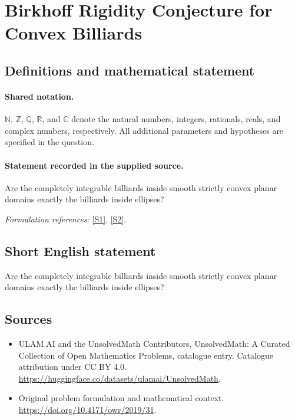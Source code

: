 \documentclass[11pt]{article}
\newcommand{\sref}[2]{\hyperlink{source:#1:#2}{[S#2]}}
\begin{document}
\section{Birkhoff Rigidity Conjecture for Convex Billiards}\label{statement}

\subsection{Definitions and mathematical statement}

\paragraph{Shared notation.}$\mathbb N$, $\mathbb Z$, $\mathbb Q$, $\mathbb R$, and $\mathbb C$ denote the natural numbers, integers, rationals, reals, and complex numbers, respectively. All additional parameters and hypotheses are specified in the question.


\paragraph{Statement recorded in the supplied source.}
Are the completely integrable billiards inside smooth strictly convex planar domains exactly the billiards inside ellipses?
\par\smallskip\textit{Formulation references:} \sref{statement}{1}, \sref{statement}{2}.
\subsection{Short English statement}
Are the completely integrable billiards inside smooth strictly convex planar domains exactly the billiards inside ellipses?
\subsection{Sources}
\begin{itemize}
\item[\hypertarget{source:statement:1}{S1}] ULAM.AI and the UnsolvedMath Contributors, UnsolvedMath: A Curated Collection of Open Mathematics Problems, catalogue entry. Catalogue attribution under CC BY 4.0.
\url{https://huggingface.co/datasets/ulamai/UnsolvedMath}.
\item[\hypertarget{source:statement:2}{S2}] Original problem formulation and mathematical context.
\url{https://doi.org/10.4171/owr/2019/31}.
\end{itemize}
\label{end:statement}
\end{document}
